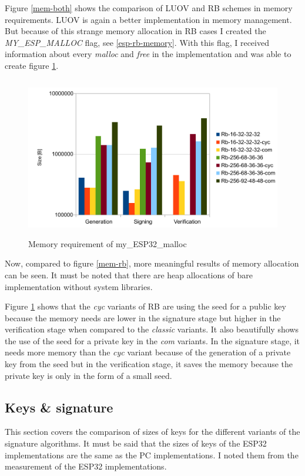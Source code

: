 \documentclass[thesis=M,english]{FITthesis}[2019/12/23]
\begin{document}
\noindent
Figure \ref{mem-both} shows the comparison of LUOV and RB schemes in memory requirements. LUOV is again a better implementation in memory management. But because of this strange memory allocation in RB cases I created the \textit{MY\_ESP\_MALLOC} flag, see \ref{esp-rb-memory}. With this flag, I received information about every \textit{malloc} and \textit{free} in the implementation and was able to create figure \ref{mem-my-alloc}.

\begin{figure}[H]
\centering
\includegraphics[width=13cm,height=7cm]{images/mem-my_esp_malloc.pdf}
\caption{Memory requirement of my\_ESP32\_malloc}
\label{mem-my-alloc}
\end{figure}

\noindent
Now, compared to figure \ref{mem-rb}, more meaningful results of memory allocation can be seen. It must be noted that there are heap allocations of bare implementation without system libraries.

\bigskip
\noindent
Figure \ref{mem-my-alloc} shows that the \textit{cyc} variants of RB are using the seed for a public key because the memory needs are lower in the signature stage but higher in the verification stage when compared to the \textit{classic} variants. It also beautifully shows the use of the seed for a private key in the \textit{com} variants. In the signature stage, it needs more memory than the \textit{cyc} variant because of the generation of a private key from the seed but in the verification stage, it saves the memory because the private key is only in the form of a small seed.

\subsection{Keys \& signature} \label{key_sign}
This section covers the comparison of sizes of keys for the different variants of the signature algorithms. It must be said that the sizes of keys of the ESP32 implementations are the same as the PC implementations. I noted them from the measurement of the ESP32 implementations.
\end{document}
